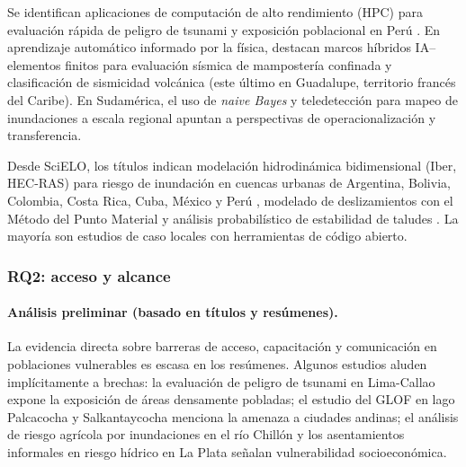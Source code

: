 \documentclass[12pt,a4paper]{article}
\begin{document}
Se identifican aplicaciones de computación de alto rendimiento (HPC) para evaluación rápida de peligro de tsunami y exposición poblacional en Perú \parencite{garcia2025parallel}. En aprendizaje automático informado por la física, destacan marcos híbridos IA--elementos finitos para evaluación sísmica de mampostería confinada \parencite{yupanqui2025hybrid} y clasificación de sismicidad volcánica \parencite{falcin2021machine} (este último en Guadalupe, territorio francés del Caribe). En Sudamérica, el uso de \textit{naive Bayes} y teledetección para mapeo de inundaciones a escala regional \parencite{kuchinski2025regional} apuntan a perspectivas de operacionalización y transferencia. 

Desde SciELO, los títulos indican modelación hidrodinámica bidimensional (Iber, HEC-RAS) para riesgo de inundación en cuencas urbanas de Argentina, Bolivia, Colombia, Costa Rica, Cuba, México y Perú \parencite{snchezpineda2025evaluaci, rojasguerrero2025lisis, la2025modelizaci, gutirrezgarca2022modelaci, watson2022case, zamora2021evaluaci, crdovalpez2021alternativas, crdovadehorta2021simulaci, garcaf2021integrando}, modelado de deslizamientos con el Método del Punto Material \parencite{lemus2024modelaci} y análisis probabilístico de estabilidad de taludes \parencite{ariasvalencia2024lisis}. La mayoría son estudios de caso locales con herramientas de código abierto.

\subsubsection{RQ2: acceso y alcance}
\label{sec:rq2}
\paragraph*{Análisis preliminar (basado en títulos y resúmenes).}
La evidencia directa sobre barreras de acceso, capacitación y comunicación en poblaciones vulnerables es escasa en los resúmenes. Algunos estudios aluden implícitamente a brechas: la evaluación de peligro de tsunami en Lima-Callao \parencite{quesquen2025tsunami, androsov2024nonlinear, garcia2025parallel} expone la exposición de áreas densamente pobladas; el estudio del GLOF en lago Palcacocha \parencite{stuartsmith2021increased} y Salkantaycocha \parencite{vilca2021glacial} menciona la amenaza a ciudades andinas; el análisis de riesgo agrícola por inundaciones en el río Chillón \parencite{lpezsilva2025spatial} y los asentamientos informales en riesgo hídrico en La Plata \parencite{gonzlezbiffis2022asentamientos} señalan vulnerabilidad socioeconómica. 
\end{document}
